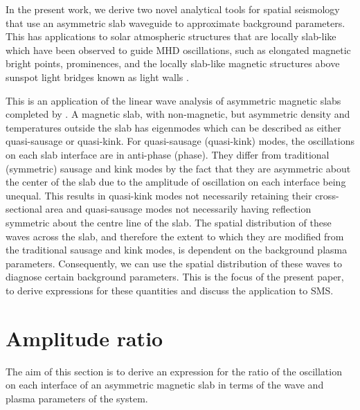 \documentclass[namedreferences]{solarphysics}
\numberwithin{equation}{section}
\begin{document}
\begin{article}
In the present work, we derive two novel analytical tools for spatial seismology that use an asymmetric slab waveguide to approximate background parameters. This has applications to solar atmospheric structures that are locally slab-like which have been observed to guide MHD oscillations, such as elongated magnetic bright points, prominences, and the locally slab-like magnetic structures above sunspot light bridges known as light walls \citep{arr_etal12,yan_etal17,zha_etal17}.

This is an application of the linear wave analysis of asymmetric magnetic slabs completed by \cite{all_etal17}. A magnetic slab, with non-magnetic, but asymmetric density and temperatures outside the slab has eigenmodes which can be described as either quasi-sausage or quasi-kink. For quasi-sausage (quasi-kink) modes, the oscillations on each slab interface are in anti-phase (phase). They differ from traditional (symmetric) sausage and kink modes by the fact that they are asymmetric about the center of the slab due to the amplitude of oscillation on each interface being unequal. This results in quasi-kink modes not necessarily retaining their cross-sectional area and quasi-sausage modes not necessarily having reflection symmetric about the centre line of the slab. The spatial distribution of these waves across the slab, and therefore the extent to which they are modified from the traditional sausage and kink modes, is dependent on the background plasma parameters. Consequently, we can use the spatial distribution of these waves to diagnose certain background parameters. This is the focus of the present paper, to derive expressions for these quantities and discuss the application to SMS.


\section{Amplitude ratio} \label{sec: AR}
The aim of this section is to derive an expression for the ratio of the oscillation on each interface of an asymmetric magnetic slab in terms of the wave and plasma parameters of the system.


\end{article}
\end{document}
